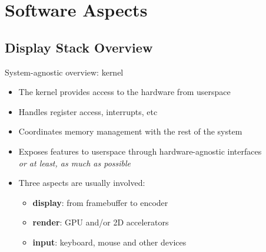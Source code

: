\section{Software Aspects}

\subsection{Display Stack Overview}

\begin{frame}{System-agnostic overview: kernel}
  \begin{itemize}
  \item The kernel provides access to the hardware from userspace
  \item Handles register access, interrupts, etc
  \item Coordinates memory management with the rest of the system
  \item Exposes features to userspace through hardware-agnostic interfaces\\
  \textit{or at least, as much as possible}
  \item Three aspects are usually involved:
    \begin{itemize}
    \item \textbf{display}: from framebuffer to encoder
    \item \textbf{render}: GPU and/or 2D accelerators
    \item \textbf{input}: keyboard, mouse and other devices
    \end{itemize}
  \end{itemize}
\end{frame}

